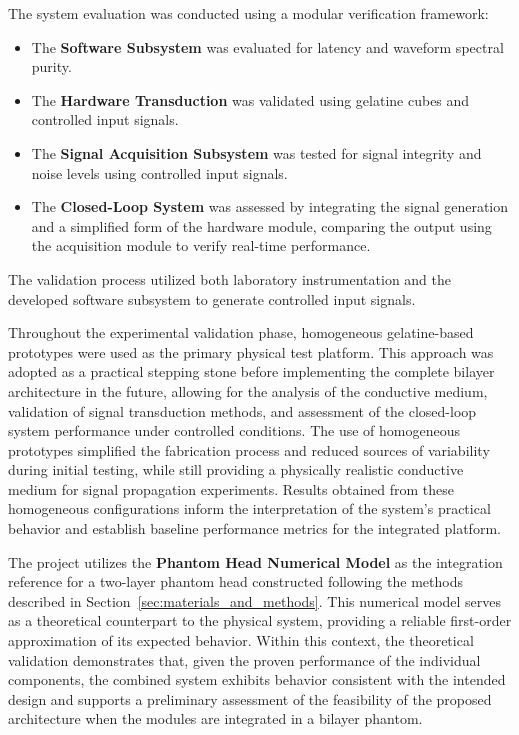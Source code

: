\documentclass[../00_Main.tex]{subfiles}
\begin{document}
The system evaluation was conducted using a modular verification framework:
\begin{itemize}
    \item The \textbf{Software Subsystem} was evaluated for latency and waveform spectral purity.
    \item The \textbf{Hardware Transduction} was validated using gelatine cubes and controlled input signals.
    \item The \textbf{Signal Acquisition Subsystem} was tested for signal integrity and noise levels using controlled input signals.
    \item The \textbf{Closed-Loop System} was assessed by integrating the signal generation and a simplified form of the hardware module, comparing the output using the acquisition module to verify real-time performance.
\end{itemize}

The validation process utilized both laboratory instrumentation and the developed software subsystem to generate controlled input signals.

Throughout the experimental validation phase, homogeneous gelatine-based prototypes were used as the primary physical test platform. This approach was adopted as a practical stepping stone before implementing the complete bilayer architecture in the future, allowing for the analysis of the conductive medium, validation of signal transduction methods, and assessment of the closed-loop system performance under controlled conditions. The use of homogeneous prototypes simplified the fabrication process and reduced sources of variability during initial testing, while still providing a physically realistic conductive medium for signal propagation experiments. Results obtained from these homogeneous configurations inform the interpretation of the system's practical behavior and establish baseline performance metrics for the integrated platform.

The project utilizes the \textbf{Phantom Head Numerical Model} as the integration reference for a two-layer phantom head constructed following the methods described in Section~\ref{sec:materials_and_methods}. This numerical model serves as a theoretical counterpart to the physical system, providing a reliable first-order approximation of its expected behavior. Within this context, the theoretical validation demonstrates that, given the proven performance of the individual components, the combined system exhibits behavior consistent with the intended design and supports a preliminary assessment of the feasibility of the proposed architecture when the modules are integrated in a bilayer phantom.
\end{document}
